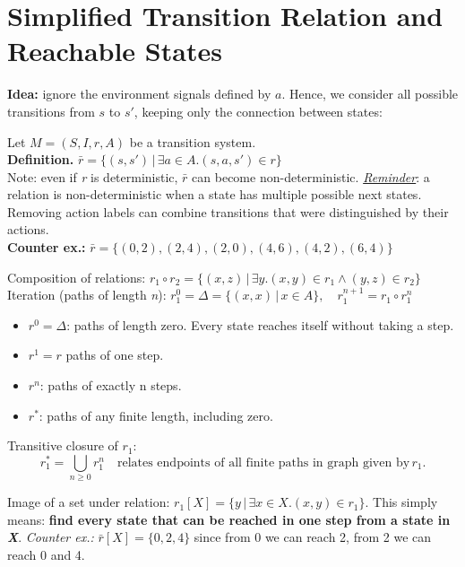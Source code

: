 \documentclass[11pt]{article}
\begin{document}
\section*{Simplified Transition Relation and Reachable States}

\textbf{Idea:} ignore the environment signals defined by $a$. Hence, we consider all possible transitions from $s$ to $s'$, keeping only the connection between states: 

\begin{tcolorbox}[
    enhanced,
    frame hidden,
    borderline west={2pt}{0pt}{black},
    boxsep=5pt,
    left=8pt
]
Let $M = (S, I, r, A)$ be a transition system. \\
\textbf{Definition.} $\bar{r} = \{(s, s') \, | \, \exists a \in A. (s, a, s') \in r\}$ \\

Note: even if \textit{r} is deterministic, $\bar{r}$ can become non-deterministic. \textit{\underline{Reminder}}: a relation is non-deterministic when a state has multiple possible next states. Removing action labels can combine transitions that were distinguished by their actions. \\ 

\textbf{Counter ex.: } $\bar{r} = \{ (0, 2), (2, 4), (2, 0), (4, 6), (4, 2), (6, 4)\}$

\end{tcolorbox}

\begin{tcolorbox}[
  colback=green!15,     %
  colframe=black!50,    %
  boxrule=1pt,       %
  arc=3mm,             %
  left=4mm, right=4mm, top=2mm, bottom=2mm %
]
Composition of relations: $r_1 \circ r_2 = \{ (x, z) \, | \, \exists y.(x, y) \in r_1 \land (y, z) \in r_2\}$ \\
Iteration (paths of length \textit{n}): $r_1^{0} = \Delta = \{(x,x) \, | \, x \in A\}, \quad r_1^{n+1} = r_1 \circ r_1^{n}$ 
\begin{itemize}
	\item $r^{0} = \Delta$: paths of length zero. Every state reaches itself without taking a step. 
	\item $r^{1} = r$ paths of one step. 
	\item $r^{n}$: paths of exactly n steps.
	\item $r^{*}$: paths of any finite length, including zero. 
\end{itemize}

Transitive closure of $r_1$: 
\[
	r_1^{*} = \bigcup_{n \geq 0} r_1^{n} \quad \text{relates endpoints of all finite paths in graph given by} \, r_1
.\] 

Image of a set under relation: $r_1[X] = \{y \, | \, \exists x \in X.(x,y) \in r_1\}$. This simply means: \textbf{find every state that can be reached in one step from a state in \textit{X}}. \textit{Counter ex.:} $\bar{r}[X] = \{0, 2, 4\}$ since from 0 we can reach 2, from 2 we can reach 0 and 4. 
\end{tcolorbox}
\end{document}
